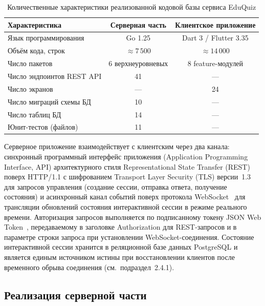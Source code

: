 \begin{table}[!htb]
\fontsize{11pt}{13pt}\selectfont
\centering
\caption{Количественные характеристики реализованной кодовой базы сервиса EduQuiz}
\label{tab:codebase-stats}
\smallskip
\begin{tabular}{|l|c|c|}
    \hline
    \textbf{Характеристика} & \textbf{Серверная часть} & \textbf{Клиентское приложение} \\
    \hline
        Язык программирования       & Go 1.25       & Dart 3 / Flutter 3.35 \\
    \hline
        Объём кода, строк           & $\approx 7\,500$ & $\approx 14\,000$ \\
    \hline
        Число пакетов               & 6 верхнеуровневых & 8 feature-модулей \\
    \hline
        Число эндпоинтов REST API   & 41            & ---     \\
    \hline
        Число экранов               & ---           & 24      \\
    \hline
        Число миграций схемы БД     & 10            & ---     \\
    \hline
        Число таблиц БД             & 14            & ---     \\
    \hline
        Юнит-тестов (файлов)        & 11            & ---     \\
    \hline
\end{tabular}
\end{table}
\FloatBarrier

Серверное приложение взаимодействует с клиентским через два
канала: синхронный программный интерфейс приложения (Application
Programming Interface, API) архитектурного стиля Representational
State Transfer (REST) поверх HTTP/1.1 с шифрованием Transport
Layer Security (TLS) версии~1.3 для запросов управления
(создание сессии, отправка ответа, получение состояния)
и асинхронный канал событий поверх протокола WebSocket~\cite{rfc6455}
для трансляции обновлений состояния интерактивной сессии в режиме
реального времени. Авторизация запросов выполняется по подписанному
токену JSON Web Token~\cite{rfc7519}, передаваемому в заголовке
Authorization для REST-запросов и в параметре строки
запроса при установлении WebSocket-соединения. Состояние интерактивной
сессии хранится в реляционной базе данных PostgreSQL и является
единым источником истины при восстановлении клиентов после
временного обрыва соединения (см.~подраздел~2.4.1).

\subsection{Реализация серверной части}

